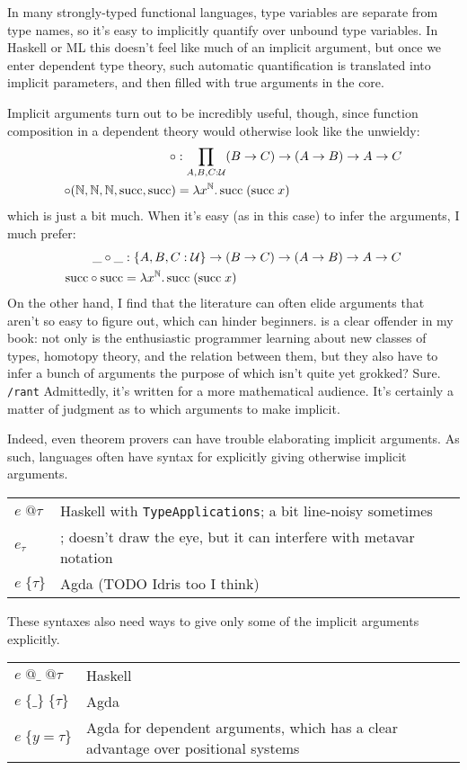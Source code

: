 \documentclass[11pt]{article} %
\theoremstyle{definition}
\theoremstyle{remark}
\begin{document}
In many strongly-typed functional languages, type variables are separate from type names, so it's easy to implicitly quantify over unbound type variables.
In Haskell or ML this doesn't feel like much of an implicit argument, but once we enter dependent type theory, such automatic quantification is translated into implicit parameters, and then filled with true arguments in the core.

Implicit arguments turn out to be incredibly useful, though, since function composition in a dependent theory would otherwise look like the unwieldy:
\begin{align*}
\circ &: \prod_{A,B,C:\mathcal U}(B \to C) \to (A \to B) \to A \to C \\
\circ(\mathbb N, \mathbb N, \mathbb N, \mathrm{succ}, \mathrm{succ}) &= {\lambda}{x^\mathbb N}.\,\mathrm{succ}\;(\mathrm{succ}\;x)
\end{align*}
which is just a bit much.
When it's easy (as in this case) to infer the arguments, I much prefer:
\begin{align*}
\_ \circ \_ &: \{A, B, C : \mathcal U\} \to (B \to C) \to (A \to B) \to A \to C \\
\mathrm{succ} \circ \mathrm{succ} &= {\lambda}{x^\mathbb N}.\,\mathrm{succ}\;(\mathrm{succ}\;x)
\end{align*}
On the other hand, I find that the literature can often elide arguments that aren't so easy to figure out, which can hinder beginners.
\cite{hottbook} is a clear offender in my book: not only is the enthusiastic programmer learning about new classes of types, homotopy theory, and the relation between them, but they also have to infer a bunch of arguments the purpose of which isn't quite yet grokked? Sure. \verb!/rant! Admittedly, it's written for a more mathematical audience.
It's certainly a matter of judgment as to which arguments to make implicit.

Indeed, even theorem provers can have trouble elaborating implicit arguments.
As such, languages often have syntax for explicitly giving otherwise implicit arguments.
\begin{center}
\renewcommand{\arraystretch}{1.2}
\begin{tabular}{lp{8.2cm}}
$e\;@\tau$ & Haskell with \texttt{TypeApplications}; a bit line-noisy sometimes \\
$e_\tau$ & \cite{hottbook}; doesn't draw the eye, but it can interfere with metavar notation \\
$e\;\{\tau\}$ & Agda (TODO Idris too I think) \\
\end{tabular}
\end{center}
These syntaxes also need ways to give only some of the implicit arguments explicitly.
\begin{center}
\renewcommand{\arraystretch}{1.2}
\begin{tabular}{lp{8.2cm}}
$e\;@\_\;@\tau$ & Haskell \\
$e\;\{\_\}\;\{\tau\}$ & Agda \\
$e\;\{y = \tau\}$ & Agda for dependent arguments, which has a clear advantage over positional systems \\
\end{tabular}
\end{center}
\end{document}
